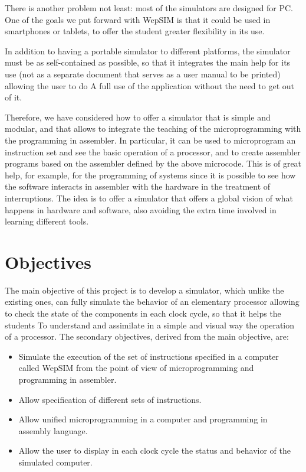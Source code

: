 There is another problem not least: most of the simulators are designed for PC. One of the goals we put forward with WepSIM is that it could be used in smartphones or tablets, to offer the student greater flexibility in its use.

In addition to having a portable simulator to different platforms, the simulator must be as self-contained as possible, so that it integrates the main help for its use (not as a separate document that serves as a user manual to be printed) allowing the user to do A full use of the application without the need to get out of it.

Therefore, we have considered how to offer a simulator that is simple and modular, and that allows to integrate the teaching of the microprogramming with the programming in assembler. In particular, it can be used to microprogram an instruction set and see the basic operation of a processor, and to create assembler programs based on the assembler defined by the above microcode. This is of great help, for example, for the programming of systems since it is possible to see how the software interacts in assembler with the hardware in the treatment of interruptions. The idea is to offer a simulator that offers a global vision of what happens in hardware and software, also avoiding the extra time involved in learning different tools.


\section{Objectives}

The main objective of this project is to develop a simulator, which unlike the existing ones, can fully simulate the behavior of an elementary processor allowing to check the state of the components in each clock cycle, so that it helps the students To understand and assimilate in a simple and visual way the operation of a processor. The secondary objectives, derived from the main objective, are:

\begin{itemize}

\item Simulate the execution of the set of instructions specified in a computer called WepSIM from the point of view of microprogramming and programming in assembler.

\item Allow specification of different sets of instructions.

\item Allow unified microprogramming in a computer and programming in assembly language.


\item Allow the user to display in each clock cycle the status and behavior of the simulated computer.

\end{itemize}


